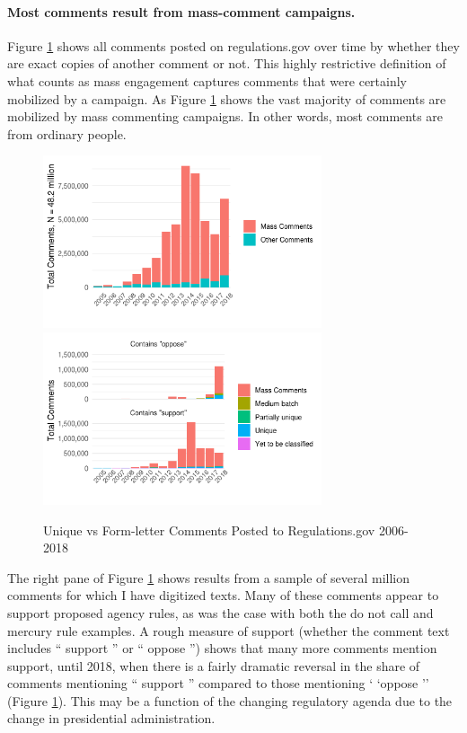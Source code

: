 

\paragraph{Most comments result from mass-comment campaigns.}
Figure \ref{fig:comments-support} shows all comments posted on regulations.gov over time by whether they are exact copies of another comment or not. This highly restrictive definition of what counts as mass engagement captures comments that were certainly mobilized by a campaign. As Figure \ref{fig:comments-support} shows the vast majority of comments are mobilized by mass commenting campaigns. In other words, most comments are from ordinary people.

\begin{figure}
    \centering
        \caption{Unique vs Form-letter Comments Posted to Regulations.gov 2006-2018}
    \includegraphics[height =2in]{Figs/comments-mass-vs-unique-1.png}
    \includegraphics[height =2in]{Figs/comments-mass-support-vs-oppose-1.png}

    \label{fig:comments-support}
\end{figure}

The right pane of Figure \ref{fig:comments-support} shows results from a sample of several million comments for which I have digitized texts. Many of these comments appear to support proposed agency rules, as was the case with both the do not call and mercury rule examples. A rough measure of support (whether the comment text includes `` support '' or `` oppose '') shows that many more comments mention support, until 2018, when there is a fairly dramatic reversal in the share of comments mentioning `` support '' compared to those mentioning ` `oppose '' (Figure \ref{fig:comments-support}). This may be a function of the changing regulatory agenda due to the change in presidential administration. 



